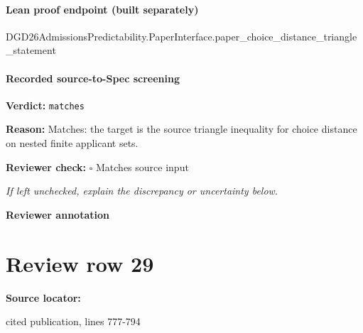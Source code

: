 \documentclass[10pt]{article}
\newcommand{\reviewerbox}{%
  \par\noindent\fbox{\parbox{0.96\linewidth}{\rule{0pt}{0.38in}}}\par
}
\newcommand{\reviewmatch}[1]{%
  \par\noindent\textbf{Reviewer check:} $\square$\; #1\par
  \noindent\emph{If left unchecked, explain the discrepancy or uncertainty below.}\par
}
\begin{document}
\paragraph{Lean proof endpoint (built separately)}\begin{ReviewVerbatim}
DGD26AdmissionsPredictability.PaperInterface.paper_choice_distance_triangle_statement
\end{ReviewVerbatim}

\paragraph{Recorded source-to-Spec screening}
\textbf{Verdict:} \texttt{matches}
\\
{\raggedright
\textbf{Reason:} Matches:\allowbreak{} the target is the source triangle inequality for choice distance on nested finite applicant sets.\allowbreak{}
\par}
\reviewmatch{Matches source input}
\noindent\textbf{Reviewer annotation}\par
\reviewerbox
\clearpage
\hypertarget{source-claim-f8de55f9c5760a87}{}
\section*{Review row 29}
\textbf{Source locator:} {\footnotesize\raggedright cited publication, lines 777-\allowbreak{}794\par}
\end{document}
